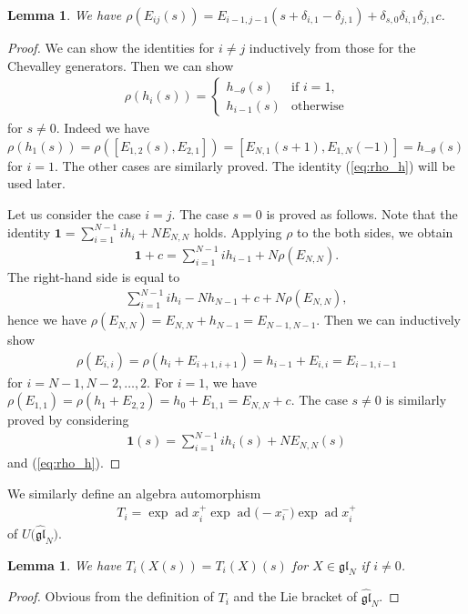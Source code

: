 \documentclass[pdftex]{sigma}
\newtheorem{lem}[thm]{Lemma}
\theoremstyle{definition}
\numberwithin{equation}{section}
\DeclareMathOperator{\ad}{ad}
\newcommand{\gl}{\mathfrak{gl}}
\newcommand{\bfid}{\mathbf{1}}
\begin{document}
\begin{lem}\label{lem:rho}We have $\rho(E_{ij}(s)) = E_{i-1,j-1}(s+\delta_{i,1}-\delta_{j,1}) + \delta_{s,0}\delta_{i,1}\delta_{j,1}c$.
\end{lem}
\begin{proof}We can show the identities for $i \neq j$ inductively from those for the Chevalley generators. Then we can show
\begin{gather}
\rho(h_i(s)) = \begin{cases}
h_{-\theta}(s) & \text{if $i=1$},\\
h_{i-1}(s) & \text{otherwise}
\end{cases}\label{eq:rho_h}
\end{gather}
for $s \neq 0$. Indeed we have $\rho(h_1(s)) = \rho([E_{1,2}(s), E_{2,1}]) = [E_{N,1}(s+1), E_{1,N}(-1)] = h_{-\theta}(s)$ for $i=1$. The other cases are similarly proved. The identity (\ref{eq:rho_h}) will be used later.

Let us consider the case $i = j$. The case $s=0$ is proved as follows. Note that the identity $\bfid = \sum\limits_{i=1}^{N-1} i h_i + N E_{N,N}$ holds. Applying $\rho$ to the both sides, we obtain
\begin{gather*}
\bfid + c = \sum_{i=1}^{N-1} i h_{i-1} + N \rho(E_{N,N}).
\end{gather*}
The right-hand side is equal to
\begin{gather*}
\sum_{i=1}^{N-1} i h_i - N h_{N-1} + c + N \rho(E_{N,N}),
\end{gather*}
hence we have $\rho(E_{N,N}) = E_{N,N} + h_{N-1} = E_{N-1,N-1}$. Then we can inductively show
\begin{gather*}
\rho(E_{i,i}) = \rho(h_i + E_{i+1,i+1}) = h_{i-1} + E_{i,i} = E_{i-1,i-1}
\end{gather*}
for $i=N-1,N-2,\ldots,2$. For $i=1$, we have $\rho(E_{1,1}) = \rho(h_1 + E_{2,2}) = h_{0} + E_{1,1} = E_{N,N} + c$. The case $s \neq 0$ is similarly proved by considering
\begin{gather*}
\bfid(s) = \sum_{i=1}^{N-1} i h_i(s) + N E_{N,N}(s)
\end{gather*}
and (\ref{eq:rho_h}).
\end{proof}

We similarly define an algebra automorphism
\begin{gather*}
T_i = \exp\ad x_i^+ \exp\ad\big({-}x_i^-\big) \exp\ad x_i^+
\end{gather*}
of $U\big(\hat{\gl}_N\big)$.

\begin{lem}\label{lem:higher}We have $T_i(X(s))=T_i(X)(s)$ for $X \in \gl_N$ if $i \neq 0$.
\end{lem}
\begin{proof}Obvious from the definition of $T_i$ and the Lie bracket of $\hat{\gl}_N$.
\end{proof}
\end{document}
